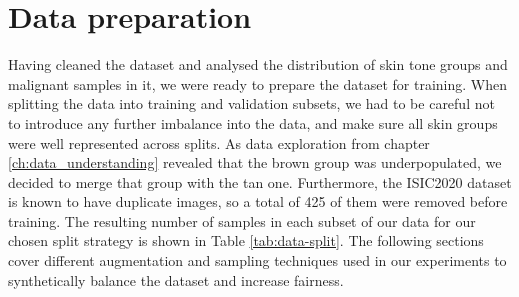 \chapter{Data preparation}
\label{ch:data_preparation}


Having cleaned the dataset and analysed the distribution of skin tone groups and malignant samples in it, we were ready to prepare the dataset for training. When splitting the data into training and validation subsets, we had to be careful not to introduce any further imbalance into the data, and make sure all skin groups were well represented across splits. As data exploration from chapter \ref{ch:data_understanding} revealed that the brown group was underpopulated, we decided to merge that group with the tan one. Furthermore, the ISIC2020 dataset is known to have duplicate images, so a total of 425 of them were removed before training. The resulting number of samples in each subset of our data for our chosen split strategy is shown in Table \ref{tab:data-split}. The following sections cover different augmentation and sampling techniques used in our experiments to synthetically balance the dataset and increase fairness.

